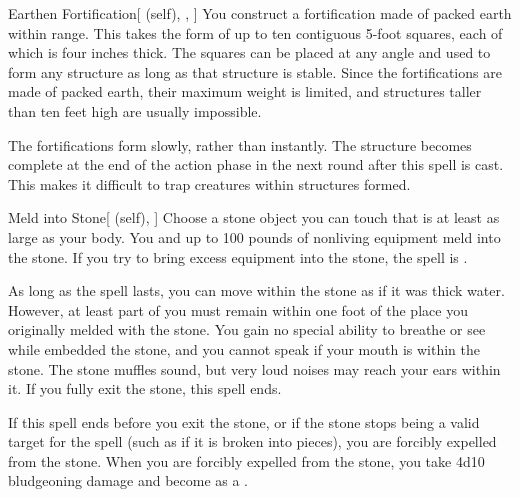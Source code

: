 \lowercase{\hypertarget{spell:Earthen Fortification}{}}\label{spell:Earthen Fortification}
\begin{ability}[\nth{2}]{\hypertarget{spell:Earthen Fortification}{Earthen Fortification}}[ (self), , ]
You construct a fortification made of packed earth within \rngmed range.
This takes the form of up to ten contiguous 5-foot squares, each of which is four inches thick.
The squares can be placed at any angle and used to form any structure as long as that structure is stable.
Since the fortifications are made of packed earth, their maximum weight is limited, and structures taller than ten feet high are usually impossible.

The fortifications form slowly, rather than instantly.
The structure becomes complete at the end of the action phase in the next round after this spell is cast.
This makes it difficult to trap creatures within structures formed.
\end{ability}
\vspace{0.25em}



\lowercase{\hypertarget{spell:Meld into Stone}{}}\label{spell:Meld into Stone}
\begin{ability}[\nth{2}]{\hypertarget{spell:Meld into Stone}{Meld into Stone}}[ (self), ]
Choose a stone object you can touch that is at least as large as your body.
You and up to 100 pounds of nonliving equipment meld into the stone.
If you try to bring excess equipment into the stone, the spell is .

As long as the spell lasts, you can move within the stone as if it was thick water.
However, at least part of you must remain within one foot of the place you originally melded with the stone.
You gain no special ability to breathe or see while embedded the stone, and you cannot speak if your mouth is within the stone.
The stone muffles sound, but very loud noises may reach your ears within it.
If you fully exit the stone, this spell ends.

If this spell ends before you exit the stone, or if the stone stops being a valid target for the spell (such as if it is broken into pieces), you are forcibly expelled from the stone.
When you are forcibly expelled from the stone, you take 4d10 bludgeoning damage and become  as a .
\end{ability}
\vspace{0.25em}



